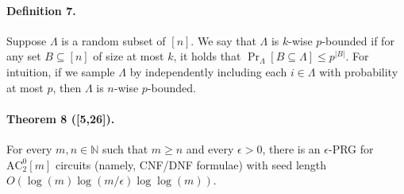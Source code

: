 \paragraph{Definition 7.} Suppose $\Lambda$ is a random subset of $[n]$. We say that $\Lambda$ is $k$-wise $p$-bounded if for any set $B\subseteq[n]$ of size at most $k$, it holds that $\Pr_\Lambda[B\subseteq\Lambda]\le p^{|B|}$. For intuition, if we sample $\Lambda$ by independently including each $i\in\Lambda$ with probability at most $p$, then $\Lambda$ is $n$-wise $p$-bounded.
\paragraph{Theorem 8 ([5,26]).} For every $m,n\in\mathbb N$ such that $m\ge n$ and every $\epsilon>0$, there is an $\epsilon$-PRG for $\mathrm{AC}^0_2[m]$ circuits (namely, CNF/DNF formulae) with seed length $O(\log(m)\log(m/\epsilon)\log\log(m))$.

